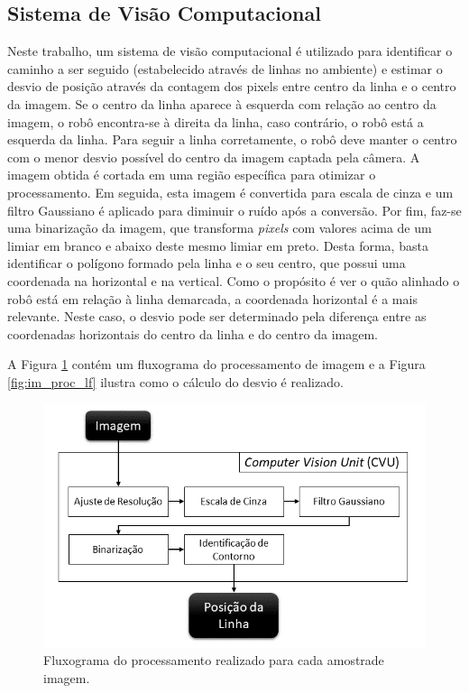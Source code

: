 \documentclass[a4paper]{ifacconf}
\begin{document}
\subsection{Sistema de Visão Computacional}

Neste trabalho, um sistema de visão computacional é utilizado para identificar o caminho a ser seguido (estabelecido através de linhas no ambiente) e estimar o desvio de posição através da contagem dos pixels entre centro da linha e o centro da imagem. Se o centro da linha aparece à esquerda com relação ao centro da imagem, o robô encontra-se à direita da linha, caso contrário, o robô está a esquerda da linha. Para seguir a linha corretamente, o robô deve manter o centro com o menor desvio possível do centro da imagem captada pela câmera.  
A imagem obtida é cortada em uma região específica para otimizar o processamento. Em seguida, esta imagem é convertida para escala de cinza e um filtro Gaussiano é aplicado para diminuir o ruído após a conversão. Por fim, faz-se uma binarização da imagem, que transforma \textit{pixels} com valores acima de um limiar em branco e abaixo deste mesmo limiar em preto. Desta forma, basta identificar o polígono formado pela linha e o seu centro, que possui uma coordenada na horizontal e na vertical. Como o propósito é ver o quão alinhado o robô está em relação à linha demarcada, a coordenada horizontal é a mais relevante. Neste caso, o desvio pode ser determinado pela diferença entre as coordenadas horizontais do centro da linha e do centro da imagem. 

A Figura \ref{fig:cvuBlocks} contém um fluxograma do processamento de imagem e a Figura \ref{fig:im_proc_lf} ilustra como o cálculo do desvio é realizado.

\begin{figure}
\centering 
\includegraphics[scale=0.5]{Figuras/cvuBlocks2.png}
\caption{Fluxograma do processamento realizado para cada amostrade imagem.}
 \label{fig:cvuBlocks}
\end{figure}
\end{document}
